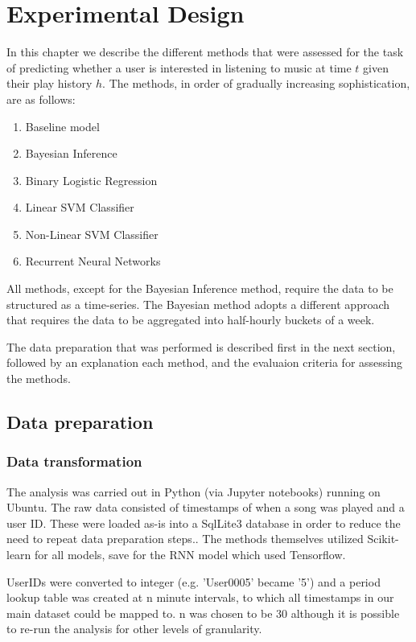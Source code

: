 
\chapter{Experimental Design}

\label{Chapter4} %

In this chapter we describe the different methods that were assessed for the task of predicting whether a user is interested in listening to music at time $t$ given their play history $h$. The methods, in order of gradually increasing sophistication, are as follows:

\begin{enumerate}
    \item Baseline model
	\item Bayesian Inference
	\item Binary Logistic Regression
	\item Linear SVM Classifier
	\item Non-Linear SVM Classifier
	\item Recurrent Neural Networks
\end{enumerate}

All methods, except for the Bayesian Inference method, require the data to be structured as a time-series. The Bayesian method adopts a different approach that requires the data to be aggregated into half-hourly buckets of a week.

The data preparation that was performed is described first in the next section, followed by an explanation each method, and the evaluaion criteria for assessing the methods.

\section{Data preparation}

\subsection{Data transformation}

The analysis was carried out in Python (via Jupyter notebooks) running on Ubuntu. The raw data consisted of timestamps of when a song was played and a user ID. These were loaded as-is into a SqlLite3 database in order to reduce the need to repeat data preparation steps.. The methods themselves utilized Scikit-learn for all models, save for the RNN model which used Tensorflow.

UserIDs were converted to integer (e.g. 'User0005' became '5') and a period lookup table was created at n minute intervals, to which all timestamps in our main dataset could be mapped to. n was chosen to be 30 although it is possible to re-run the analysis for other levels of granularity.


